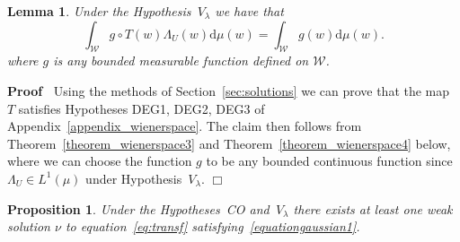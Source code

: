\documentclass[a4paper,10pt]{article}
\newcommand{\mathd}{\mathrm{d}}
\newenvironment{proof}{\noindent\textbf{Proof\ }}{\hspace*{\fill}$\Box$\medskip}
\newtheorem{lemma}[theorem]{Lemma}
\newtheorem{proposition}[theorem]{Proposition}
{\theorembodyfont{\rmfamily}\newtheorem{remark}[theorem]{Remark}}
\begin{document}
\begin{lemma}
  \label{theorem_lambda2}Under the Hypothesis~$V_{\lambda}$ we have that
  \begin{equation}
    \int_{\mathcal{W}} g \circ T (w) \Lambda_U (w) \mathd \mu (w) =
    \int_{\mathcal{W}} g (w) \mathd \mu (w) . \label{equationreduction5}
  \end{equation}
  where $g$ is any bounded measurable function defined on $\mathcal{W}$.
\end{lemma}

\begin{proof}
  Using the methods of Section~\ref{sec:solutions} we can prove that the map
  $T$ satisfies Hypotheses DEG1, DEG2, DEG3 of
  Appendix~\ref{appendix_wienerspace}. The claim then follows from
  Theorem~\ref{theorem_wienerspace3} and Theorem~\ref{theorem_wienerspace4}
  below, where we can choose the function $g$ to be any bounded continuous
  function since $\Lambda_U \in L^1 (\mu)$ under Hypothesis~$V_{\lambda}$.
\end{proof}

\begin{proposition}
  \label{proposition_reduction1}Under the Hypotheses~CO and~$V_{\lambda}$
  there exists at least one weak solution $\nu$ to
  equation~{\eqref{eq:transf}} satisfying~{\eqref{equationgaussian1}}.
\end{proposition}
\end{document}
